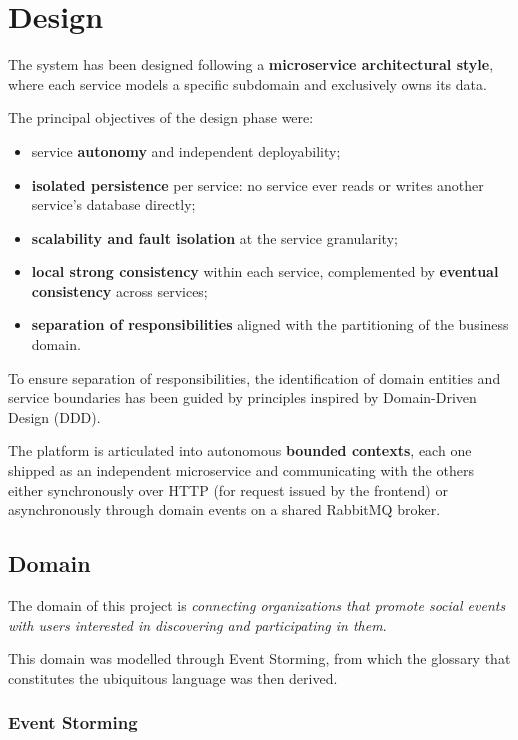 \section{Design}

The system has been designed following a \textbf{microservice architectural style}, where each service models a specific subdomain and exclusively owns its data.

The principal objectives of the design phase were:

\begin{itemize}
  \item service \textbf{autonomy} and independent deployability;
  \item \textbf{isolated persistence} per service: no service ever reads or writes another service's database directly;
  \item \textbf{scalability and fault isolation} at the service granularity;
  \item \textbf{local strong consistency} within each service, complemented by \textbf{eventual consistency} across services;
  \item \textbf{separation of responsibilities} aligned with the partitioning of the business domain.
\end{itemize}

To ensure separation of responsibilities, the identification of domain entities and service boundaries has been guided by principles inspired by Domain-Driven Design (DDD).

The platform is articulated into autonomous \textbf{bounded contexts}, each one shipped as an independent microservice and communicating with the others either synchronously over HTTP (for request issued by the frontend) or asynchronously through domain events on a shared RabbitMQ broker.

\subsection{Domain}

The domain of this project is \textit{connecting organizations that promote social events with users interested in discovering and participating in them}.

This domain was modelled through Event Storming, from which the glossary that constitutes the ubiquitous language was then derived.

\subsubsection{Event Storming}

